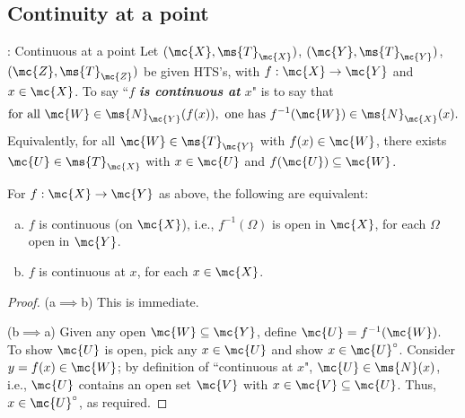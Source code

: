 \subsection{Continuity at a point}
\begin{ndef}{: Continuous at a point}
	Let \((\mc{X},\ms{T}_{\mc{X}})\), \((\mc{Y},\ms{T}_{\mc{Y}})\), \((\mc{Z},\ms{T}_{\mc{Z}})\) be given HTS's, with \(f:\mc{X}\to\mc{Y}\) and \(x\in\mc{X}\). To say ``\(f\) \emph{\textbf{is continuous at} \(x\)}" is to say that 
	\begin{equation*}
		\text{for all}~\mc{W}\in\ms{N}_{\mc{Y}}(f(x)),~\text{one has}~f^{-1}(\mc{W})\in\ms{N}_{\mc{X}}(x).
	\end{equation*} 
	Equivalently, for all \(\mc{W}\in\ms{T}_{\mc{Y}}\) with \(f(x)\in\mc{W}\), there exists \(\mc{U}\in\ms{T}_{\mc{X}}\) with \(x\in\mc{U}\) and \(f(\mc{U})\subseteq\mc{W}\).
\end{ndef}
\begin{nlemma}{}
	For \(f:\mc{X}\to\mc{Y}\) as above, the following are equivalent:
	\begin{enumerate}[(a)]
		\item \(f\) is continuous (on \(\mc{X}\)), i.e., \(f^{-1}(\Omega)\) is open in \(\mc{X}\), for each \(\Omega\) open in \(\mc{Y}\).
		
		\item \(f\) is continuous at \(x\), for each \(x\in\mc{X}\).
	\end{enumerate}
\end{nlemma}
\begin{proof}
	(a\(\implies\)b) This is immediate.
	
	\medskip
	
	(b\(\implies\)a) Given any open \(\mc{W}\subseteq\mc{Y}\), define \(\mc{U}=f^{-1}(\mc{W})\). To show \(\mc{U}\) is open, pick any \(x\in\mc{U}\) and show \(x\in\mc{U}^{\circ}\). Consider \(y=f(x)\in\mc{W}\); by definition of ``continuous at \(x\)", \(\mc{U}\in\ms{N}(x)\), i.e., \(\mc{U}\) contains an open set \(\mc{V}\) with \(x\in\mc{V}\subseteq\mc{U}\). Thus, \(x\in\mc{U}^{\circ}\), as required.
\end{proof}
